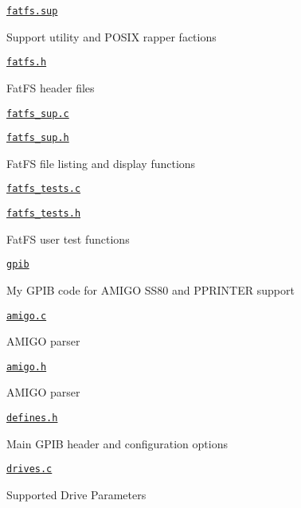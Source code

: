 \begin{DoxyItemize}
\item \href{fatfs.sup/fatfs.sup}{\tt fatfs.\+sup}
\begin{DoxyItemize}
\item Support utility and P\+O\+S\+IX rapper factions
\item \href{fatfs.sup/fatfs.h}{\tt fatfs.\+h}
\begin{DoxyItemize}
\item Fat\+FS header files
\end{DoxyItemize}
\item \href{fatfs.sup/fatfs_sup.c}{\tt fatfs\+\_\+sup.\+c}
\item \href{fatfs.sup/fatfs_sup.h}{\tt fatfs\+\_\+sup.\+h}
\begin{DoxyItemize}
\item Fat\+FS file listing and display functions
\end{DoxyItemize}
\item \href{fatfs.sup/fatfs_tests.c}{\tt fatfs\+\_\+tests.\+c}
\item \href{fatfs.sup/fatfs_tests.h}{\tt fatfs\+\_\+tests.\+h}
\begin{DoxyItemize}
\item Fat\+FS user test functions
\end{DoxyItemize}
\end{DoxyItemize}
\item \href{gpib/gpib}{\tt gpib}
\begin{DoxyItemize}
\item My G\+P\+IB code for A\+M\+I\+GO S\+S80 and P\+P\+R\+I\+N\+T\+ER support
\item \href{gpib/amigo.c}{\tt amigo.\+c}
\begin{DoxyItemize}
\item A\+M\+I\+GO parser
\end{DoxyItemize}
\item \href{gpib/amigo.h}{\tt amigo.\+h}
\begin{DoxyItemize}
\item A\+M\+I\+GO parser
\end{DoxyItemize}
\item \href{gpib/defines.h}{\tt defines.\+h}
\begin{DoxyItemize}
\item Main G\+P\+IB header and configuration options
\end{DoxyItemize}
\item \href{gpib/drives.c}{\tt drives.\+c}
\begin{DoxyItemize}
\item Supported Drive Parameters

\end{DoxyItemize}
\end{DoxyItemize}
\end{DoxyItemize}
